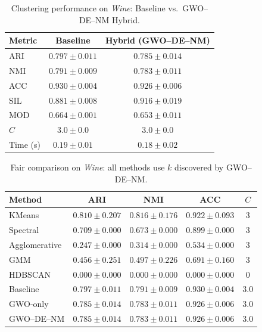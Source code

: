 \begin{table}[htbp]
\centering
\caption{Clustering performance on \textit{Wine}: Baseline vs.\ GWO--DE--NM Hybrid.}
\label{tab:wine}
\begin{tabular}{lcc}
\toprule
Metric & Baseline & Hybrid (GWO--DE--NM) \\
\midrule
ARI & $\mathbf{0.797 \pm 0.011}$ & $0.785 \pm 0.014$ \\
NMI & $\mathbf{0.791 \pm 0.009}$ & $0.783 \pm 0.011$ \\
ACC & $\mathbf{0.930 \pm 0.004}$ & $0.926 \pm 0.006$ \\
SIL & $0.881 \pm 0.008$ & $\mathbf{0.916 \pm 0.019}$ \\
MOD & $\mathbf{0.664 \pm 0.001}$ & $0.653 \pm 0.011$ \\
\midrule
$C$ & $3.0 \pm 0.0$ & $3.0 \pm 0.0$ \\
Time (s) & $0.19 \pm 0.01$ & $0.18 \pm 0.02$ \\
\bottomrule
\end{tabular}
\end{table}

\begin{table}[htbp]
\centering\small
\caption{Fair comparison on \textit{Wine}: all methods use $k$ discovered by GWO--DE--NM.}
\label{tab:fair_wine}
\begin{tabular}{lcccc}
\toprule
Method & ARI & NMI & ACC & $C$ \\
\midrule
KMeans & $\mathbf{0.810 \pm 0.207}$ & $0.816 \pm 0.176$ & $0.922 \pm 0.093$ & $3$ \\
Spectral & $0.709 \pm 0.000$ & $0.673 \pm 0.000$ & $0.899 \pm 0.000$ & $3$ \\
Agglomerative & $0.247 \pm 0.000$ & $0.314 \pm 0.000$ & $0.534 \pm 0.000$ & $3$ \\
GMM & $0.456 \pm 0.251$ & $0.497 \pm 0.226$ & $0.691 \pm 0.160$ & $3$ \\
HDBSCAN & $0.000 \pm 0.000$ & $0.000 \pm 0.000$ & $0.000 \pm 0.000$ & $0$ \\
\midrule
Baseline & $0.797 \pm 0.011$ & $0.791 \pm 0.009$ & $0.930 \pm 0.004$ & $3.0$ \\
GWO-only & $0.785 \pm 0.014$ & $0.783 \pm 0.011$ & $0.926 \pm 0.006$ & $3.0$ \\
GWO--DE--NM & $0.785 \pm 0.014$ & $0.783 \pm 0.011$ & $0.926 \pm 0.006$ & $3.0$ \\
\bottomrule
\end{tabular}
\end{table}

